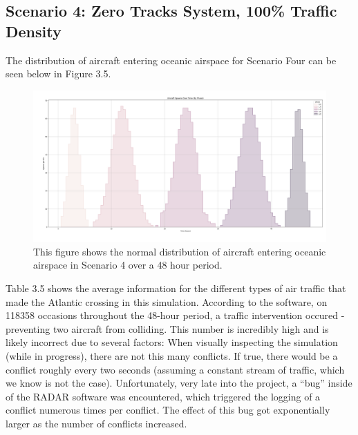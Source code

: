 \documentclass[stu, a4paper, 12pt, floatsintext]{apa7}
\numberwithin{figure}{section}
\numberwithin{table}{section}
\numberwithin{equation}{section}
\begin{document}
\subsection{Scenario 4: Zero Tracks System, 100\% Traffic Density}
The distribution of aircraft entering oceanic airspace for Scenario Four can be seen below in Figure 3.5.

\begin{figure}[H]
    \caption{This figure shows the normal distribution of aircraft entering oceanic airspace in Scenario 4 over a 48 hour period.}
    \label{fig:3.5}
    \centering
    \includegraphics[width=1.1\textwidth]{pictures/Figure 3.5.png}    
\end{figure}

Table 3.5 shows the average information for the different types of air traffic that made the Atlantic crossing in this simulation. According to the software, on 118358 occasions throughout the 48-hour period, a traffic intervention occured - preventing two aircraft from colliding. This number is incredibly high and is likely incorrect due to several factors:
When visually inspecting the simulation (while in progress), there are not this many conflicts. 
If true, there would be a conflict roughly every two seconds (assuming a constant stream of traffic, which we know is not the case). 
Unfortunately, very late into the project, a “bug” inside of the RADAR software was encountered, which triggered the logging of a conflict numerous times per conflict. The effect of this bug got exponentially larger as the number of conflicts increased.
\end{document}
